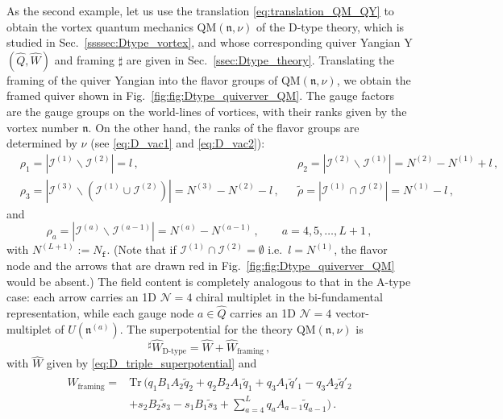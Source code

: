 \documentclass[12pt,a4paper]{article}
\newcommand{\nn}{\mathfrak{n}}
\renewcommand{\(}{\left(}
\renewcommand{\)}{\right)}
\renewcommand{\(}{\left(}
\renewcommand{\)}{\right)}
\begin{document}
As the second example, let us use the translation \eqref{eq:translation_QM_QY} to obtain the vortex quantum mechanics QM$(\nn,\nu)$ of the D-type theory, which is studied in Sec.~\ref{ssssec:Dtype_vortex}, and whose corresponding quiver Yangian Y$(\widehat{Q},\widehat{W})$ and framing $\sharp$ are given in Sec.~\ref{ssec:Dtype_theory}.
Translating the framing of the quiver Yangian into the flavor groups of QM$(\nn,\nu)$, we obtain the framed quiver shown in Fig.~\ref{fig:fig:Dtype_quiverver_QM}.
The gauge factors are the gauge groups on the world-lines of vortices, with their ranks given by the vortex number $\nn$. 
On the other hand, the ranks of the flavor groups are determined by $\nu$ (see \eqref{eq:D_vac1} and \eqref{eq:D_vac2}):
\begin{equation}
\begin{aligned}
&\rho_1=|\mathcal{I}^{(1)}\backslash\mathcal{I}^{(2)}|=l\,,
&&\rho_2=|\mathcal{I}^{(2)}\backslash\mathcal{I}^{(1)}|=N^{(2)}-N^{(1)}+l\,,\\
&\rho_3=|\mathcal{I}^{(3)}\backslash(\mathcal{I}^{(1)}\cup\mathcal{I}^{(2)})|=N^{(3)}-N^{(2)}-l\,,
&&\tilde{\rho}=|\mathcal{I}^{(1)}\cap\mathcal{I}^{(2)}|=N^{(1)}-l\,,
\end{aligned}
\end{equation}
and 
\begin{equation}
\rho_a=|\mathcal{I}^{(a)}\backslash\mathcal{I}^{(a-1)}|=N^{(a)}-N^{(a-1)}\,,\qquad a=4,5,\dots,L+1\,,
\end{equation}
with $N^{(L+1)}:=N_{\mathtt{f}}$. (Note that if $\mathcal{I}^{(1)}\cap\mathcal{I}^{(2)}=\emptyset$ i.e.\ $l=N^{(1)}$, the flavor node and the arrows that are drawn red in Fig.~\ref{fig:fig:Dtype_quiverver_QM} would be absent.)
The field content is completely analogous to that in the A-type case:
each arrow carries an 1D $\mathcal{N}=4$ chiral multiplet in the bi-fundamental representation, while each gauge node $a\in \widehat{Q}$ carries an 1D $\mathcal{N}=4$ vector-multiplet of $U(\nn^{(a)})$.
The superpotential for the theory $\textrm{QM}(\nn,\nu)$ is 
\begin{equation}
{}^{\sharp}\widehat{W}_{\textrm{D-type}}=\widehat{W}+ \widehat{W}_{\text{framing}}\,,
\end{equation}
with $\widehat{W}$ given by \eqref{eq:D_triple_superpotential} and 
\begin{equation}
\begin{aligned}
\widehat{W}_{\text{framing}}=&\mathrm{Tr}\,(q_1B_1A_2\tilde{q}_2+q_2B_2A_1\tilde{q}_1+q_3A_1\tilde{q}'_1-q_3A_2\tilde{q}'_2\\
&+s_2B_2\tilde{s}_3-s_1B_1\tilde{s}_3+\sum_{a=4}^{L}q_aA_{a-1}\tilde{q}_{a-1})\,.
\end{aligned}
\end{equation}
\end{document}
